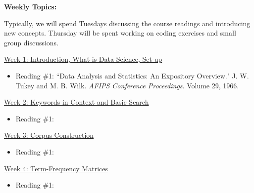 \documentclass[12pt]{article}
\begin{document}
\vspace{0.5cm}

\textbf{Weekly Topics:} \vspace{6pt}

Typically, we will spend Tuesdays discussing the course readings and
introducing new concepts. Thursday will be spent working on coding exercises
and small group discussions.

\vspace{0.5cm}

\underline{Week 1: Introduction, What is Data Science, Set-up}

\begin{itemize}[noitemsep,topsep=0pt,leftmargin=!,labelindent=5pt,itemindent=-70pt]
\item Reading \#1: ``Data Analysis and Statistics: An Expository Overview."
J. W. Tukey and M. B. Wilk. \textit{AFIPS Conference Proceedings}. Volume 29,
1966.
\end{itemize}

\vspace{12pt}

\underline{Week 2: Keywords in Context and Basic Search}

\begin{itemize}[noitemsep,topsep=0pt,leftmargin=!,labelindent=5pt,itemindent=-70pt]
\item Reading \#1:
\end{itemize}

\vspace{12pt}

\underline{Week 3: Corpus Construction}

\begin{itemize}[noitemsep,topsep=0pt,leftmargin=!,labelindent=5pt,itemindent=-70pt]
\item Reading \#1:
\end{itemize}

\vspace{12pt}

\underline{Week 4: Term-Frequency Matrices}

\begin{itemize}[noitemsep,topsep=0pt,leftmargin=!,labelindent=5pt,itemindent=-70pt]
\item Reading \#1:
\end{itemize}
\end{document}
